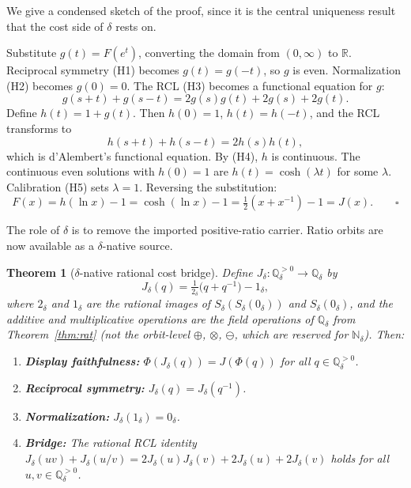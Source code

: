 \documentclass[11pt,a4paper]{article}
\newtheorem{theorem}{Theorem}[section]
\theoremstyle{definition}
\theoremstyle{remark}
\newtheorem*{proofsketch}{Proof sketch}
\let\oldproofsketch\proofsketch
\let\endoldproofsketch\endproofsketch
\renewenvironment{proofsketch}{\oldproofsketch\sloppy}{\endoldproofsketch}
\begin{document}
We give a condensed sketch of the proof, since it is the central uniqueness
result that the cost side of $\delta$ rests on.

\begin{proofsketch}
Substitute $g(t) = F(e^t)$, converting the domain from $(0,\infty)$ to
$\mathbb{R}$. Reciprocal symmetry (H1) becomes $g(t) = g(-t)$, so $g$ is
even. Normalization (H2) becomes $g(0) = 0$. The RCL (H3) becomes a
functional equation for $g$:
\[
  g(s+t) + g(s-t) = 2g(s)g(t) + 2g(s) + 2g(t).
\]
Define $h(t) = 1 + g(t)$. Then $h(0) = 1$, $h(t) = h(-t)$, and the RCL
transforms to
\[
  h(s+t) + h(s-t) = 2h(s)h(t),
\]
which is d'Alembert's functional equation. By (H4), $h$ is continuous. The
continuous even solutions with $h(0)=1$ are $h(t)=\cosh(\lambda t)$ for some
$\lambda$. Calibration (H5) sets $\lambda = 1$. Reversing the substitution:
\[
  F(x) = h(\ln x) - 1 = \cosh(\ln x) - 1
  = \tfrac{1}{2}(x + x^{-1}) - 1 = J(x). \qquad\square
\]
\end{proofsketch}

The role of $\delta$ is to remove the imported positive-ratio carrier. Ratio
orbits are now available as a $\delta$-native source.

\begin{theorem}[$\delta$-native rational cost bridge]\label{thm:bridge}
Define $J_\delta : \mathbb{Q}_\delta^{>0} \to \mathbb{Q}_\delta$ by
\[
  J_\delta(q) = \tfrac{1}{2_\delta}\bigl(q + q^{-1}\bigr) - 1_\delta,
\]
where $2_\delta$ and $1_\delta$ are the rational images of
$S_\delta(S_\delta(0_\delta))$ and $S_\delta(0_\delta)$, and the additive and
multiplicative operations are the field operations of
$\mathbb{Q}_\delta$ from Theorem~\ref{thm:rat} (not the orbit-level $\oplus$,
$\otimes$, $\ominus$, which are reserved for $\mathbb{N}_\delta$). Then:
\begin{enumerate}[leftmargin=2em, label=\textup{(\alph*)}]
  \item \textbf{Display faithfulness:}
    $\Phi(J_\delta(q)) = J(\Phi(q))$ for all $q \in
    \mathbb{Q}_\delta^{>0}$.
  \item \textbf{Reciprocal symmetry:}
    $J_\delta(q) = J_\delta(q^{-1})$.
  \item \textbf{Normalization:}
    $J_\delta(1_\delta) = 0_\delta$.
  \item \textbf{Bridge:} The rational RCL identity
    $J_\delta(uv) + J_\delta(u/v) = 2J_\delta(u)J_\delta(v)
    + 2J_\delta(u) + 2J_\delta(v)$ holds for all $u, v \in
    \mathbb{Q}_\delta^{>0}$.
\end{enumerate}
\end{theorem}
\end{document}
